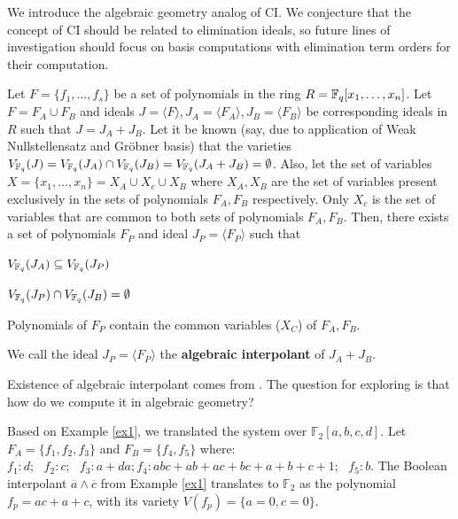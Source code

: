 We introduce the algebraic geometry analog of CI.
We conjecture that the
  concept of CI should be related to elimination ideals, so future lines
  of investigation should focus on \Grobner basis computations with
  elimination term orders for their computation.



\begin{Definition}\label{ci}
Let $F = \{f_1, \dots, f_s\}$ be a set of polynomials in the ring 
$R = {\mathbb{F}}_{q}[x_1,\dots,x_n]$. Let $F = F_A \cup F_B$ and ideals $J =
\langle F \rangle, J_A = \langle F_A \rangle, J_B = \langle F_B
\rangle$ be corresponding ideals in $R$ such that $J = J_A + J_B$. Let
it be known (say, due to application of Weak Nullstellensatz and
Gr\"obner basis) that the varieties $V_{{\mathbb{F}}_{q}}(J) = V_{{\mathbb{F}}_{q}}(J_A) \cap
V_{{\mathbb{F}}_{q}}(J_B) =V_{{\mathbb{F}}_{q}}(J_A+J_B)=\emptyset$. Also, let the set of
variables $X = \{x_1,\dots,x_n\} = X_A \cup X_c \cup X_B$ where $X_A,
X_B$ are the set of variables present exclusively in the sets of
polynomials $F_A, F_B$ respectively. Only $X_c$ is the set of
variables that are common to both sets of polynomials $F_A,
F_B$. Then, there exists a set of polynomials  $F_P$ and ideal $J_P =
\langle F_P \rangle$ such that 
\bi
\item $V_{{\mathbb{F}}_{q}}(J_A) \subseteq V_{{\mathbb{F}}_{q}}(J_P)$
\item $V_{{\mathbb{F}}_{q}}(J_P) \cap V_{{\mathbb{F}}_{q}}(J_B) = \emptyset$
\item Polynomials of $F_P$ contain the common variables ($X_C$) of
  $F_A, F_B$. 
\ei

We call the ideal $J_P = \langle F_P\rangle$ the {\bf algebraic
  interpolant} of  $J_A+J_B$. 
\end{Definition}

Existence of algebraic interpolant comes from \cite{craig-interpolate}.
The question for exploring is that how do we compute it in algebraic geometry?

\begin{Example} \label{ex2}
Based on Example \ref{ex1}, we translated the system over
$\mathbb{F}_2[a, b, c, d]$. Let $F_A = \{f_1, f_2, f_3\}$ and $F_B =
\{f_4, f_5\}$ where: $f_1: d; ~~~f_2: c; ~~~f_3: a + da; f_4:  abc +
ab + ac + bc + a + b + c + 1; ~~~f_5: b.$ The Boolean interpolant
$\overline{a}\wedge\overline{c}$ from Example \ref{ex1} translates to
${\mathbb{F}}_2$ as the polynomial $f_p = ac + a + c$, with its
variety $V(f_p) = \{a=0, c=0\}$.   
\end{Example}


